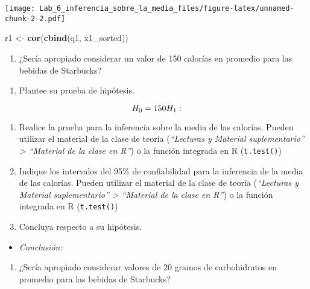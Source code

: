 \documentclass[
]{article}
\newenvironment{Shaded}{\begin{snugshade}}{\end{snugshade}}
\newcommand{\FunctionTok}[1]{\textcolor[rgb]{0.13,0.29,0.53}{\textbf{#1}}}
\newcommand{\NormalTok}[1]{#1}
\newcommand{\OtherTok}[1]{\textcolor[rgb]{0.56,0.35,0.01}{#1}}
\providecommand{\tightlist}{%
  \setlength{\itemsep}{0pt}\setlength{\parskip}{0pt}}
\begin{document}
\texttt{[image: Lab\_6\_inferencia\_sobre\_la\_media\_files/figure-latex/unnamed-chunk-2-2.pdf]}

\begin{Shaded}
\begin{Highlighting}[]
\NormalTok{r1 }\OtherTok{\textless{}{-}} \FunctionTok{cor}\NormalTok{(}\FunctionTok{cbind}\NormalTok{(q1, x1\_sorted))}
\end{Highlighting}
\end{Shaded}

\begin{enumerate}
\def\labelenumi{\arabic{enumi}.}
\setcounter{enumi}{2}
\tightlist
\item
  ¿Sería apropiado considerar un valor de 150 calorías en promedio para
  las bebidas de Starbucks?
\end{enumerate}

\begin{enumerate}
\def\labelenumi{\alph{enumi}.}
\tightlist
\item
  Plantee su prueba de hipótesis.
\end{enumerate}

\[
H_0 = 150 \\
H_1:
\]

\begin{enumerate}
\def\labelenumi{\alph{enumi}.}
\setcounter{enumi}{1}
\item
  Realice la prueba para la inferencia sobre la media de las calorías.
  Pueden utilizar el material de la clase de teoría (\emph{``Lecturas y
  Material suplementario'' \textgreater{} ``Material de la clase en
  R''}) o la función integrada en R (\texttt{t.test()})
\item
  Indique los intervalos del 95\% de confiabilidad para la inferencia de
  la media de las calorías. Pueden utilizar el material de la clase de
  teoría (\emph{``Lecturas y Material suplementario'' \textgreater{}
  ``Material de la clase en R''}) o la función integrada en R
  (\texttt{t.test()})
\item
  Concluya respecto a su hipótesis.
\end{enumerate}

\begin{itemize}
\tightlist
\item
  \emph{Conclusión:}
\end{itemize}

\begin{enumerate}
\def\labelenumi{\arabic{enumi}.}
\setcounter{enumi}{3}
\tightlist
\item
  ¿Sería apropiado considerar valores de 20 gramos de carbohidratos en
  promedio para las bebidas de Starbucks?
\end{enumerate}
\end{document}
